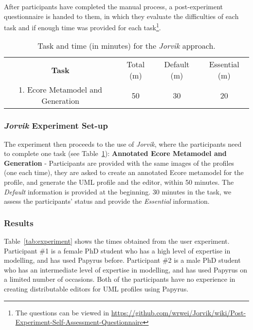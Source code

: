 After participants have completed the manual process, a post-experiment questionnaire is handed to them, in which they evaluate the difficulties of each task and if enough time was provided for each task\footnote{The questions can be viewed in \url{https://github.com/wrwei/Jorvik/wiki/Post-Experiment-Self-Assessment-Questionnaire}}.

\begin{table}[ht!]
	\centering
	\setlength{\tabcolsep}{3.5pt} 
	\caption{Task and time (in minutes) for the \textit{Jorvik} approach.}
	\begin{tabular}{|c|c|c|c|}
		\cline{1-4}
		\textbf{Task} & Total (m) & Default (m) & Essential (m) \\ 
		1. Ecore Metamodel and Generation & 50 & 30 & 20 \\ \hline
	\end{tabular}
	\label{tab:automatic}
\end{table}

\subsubsection{\textit{Jorvik} Experiment Set-up}
The experiment then proceeds to the use of \textit{Jorvik}, where the participants need to complete one task (see Table~\ref{tab:automatic}):
\textbf{Annotated Ecore Metamodel and Generation} - Participants are provided with the same images of the profiles (one each time), they are asked to create an annotated Ecore metamodel for the profile, and generate the UML profile and the editor, within 50 minutes.
	The \textit{Default} information is provided at the beginning. 
	30 minutes in the task, we assess the participants' status and provide the \textit{Essential} information.



\subsubsection{Results}
Table~\ref{tab:experiment} shows the times obtained from the user experiment.
Participant \#1 is a female PhD student who has a high level of expertise in modelling, and has used Papyrus before.
Participant \#2 is a male PhD student who has an intermediate level of expertise in modelling, and has used Papyrus on a limited number of occasions. 
Both of the participants have no experience in creating distributable editors for UML profiles using Papyrus.

